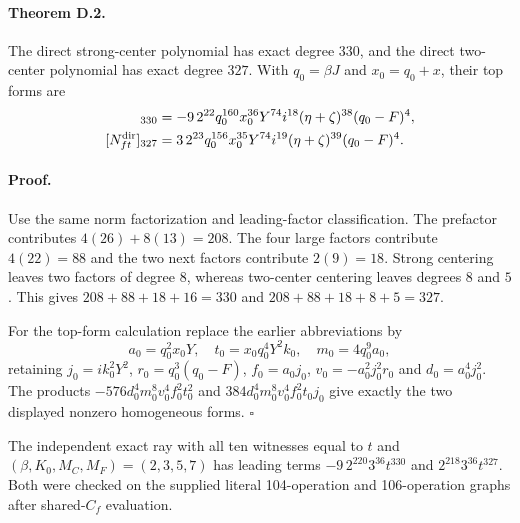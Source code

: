\paragraph{Theorem D.2.}
The direct strong-center polynomial has exact degree $330$, and the
direct two-center polynomial has exact degree $327$.  With
$q_0=\beta J$ and $x_0=q_0+x$, their top forms are
\begin{align*}
 [N_f^{\rm dir}]_{330}
   &=-9\,2^{22}q_0^{160}x_0^{36}Y^{74}i^{18}
       (\eta+\zeta)^{38}(q_0-F)^4,\\
 [N_{ft}^{\rm dir}]_{327}
   &=3\,2^{23}q_0^{156}x_0^{35}Y^{74}i^{19}
       (\eta+\zeta)^{39}(q_0-F)^4.
\end{align*}

\paragraph{Proof.}
Use the same norm factorization and leading-factor classification.
The prefactor contributes $4(26)+8(13)=208$.
The four large factors contribute $4(22)=88$ and the two next factors
contribute $2(9)=18$.  Strong centering leaves two factors of degree $8$,
whereas two-center centering leaves degrees $8$ and $5$.  This gives
$208+88+18+16=330$ and $208+88+18+8+5=327$.

For the top-form calculation replace the earlier abbreviations by
\[
 a_0=q_0^2x_0Y,\quad
 t_0=x_0q_0^4Y^2k_0,\quad m_0=4q_0^9a_0,
\]
retaining $j_0=ik_0^2Y^2$, $r_0=q_0^3(q_0-F)$,
$f_0=a_0j_0$, $v_0=-a_0^2j_0^2r_0$ and
$d_0=a_0^4j_0^2$.  The products
$-576d_0^4m_0^8v_0^4f_0^2t_0^2$ and
$384d_0^4m_0^8v_0^4f_0^2t_0j_0$ give exactly the two displayed
nonzero homogeneous forms. \hfill$\square$

The independent exact ray with all ten witnesses equal to $t$ and
$(\beta,K_0,M_C,M_F)=(2,3,5,7)$ has leading terms
$-9\,2^{220}3^{36}t^{330}$ and
$2^{218}3^{36}t^{327}$.  Both were checked on the supplied literal
104-operation and 106-operation graphs after shared-$C_f$ evaluation.
